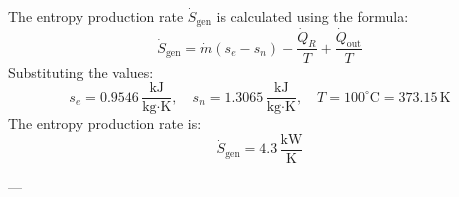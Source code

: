 The entropy production rate \(\dot{S}_{\text{gen}}\) is calculated using the formula:  
\[
\dot{S}_{\text{gen}} = \dot{m}(s_e - s_n) - \frac{\dot{Q}_R}{T} + \frac{\dot{Q}_{\text{out}}}{T}
\]  
Substituting the values:  
\[
s_e = 0.9546 \, \frac{\text{kJ}}{\text{kg·K}}, \quad s_n = 1.3065 \, \frac{\text{kJ}}{\text{kg·K}}, \quad T = 100^\circ\text{C} = 373.15 \, \text{K}
\]  
The entropy production rate is:  
\[
\dot{S}_{\text{gen}} = 4.3 \, \frac{\text{kW}}{\text{K}}
\]  

---
